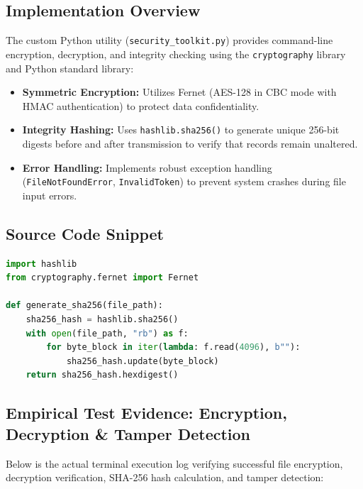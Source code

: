 \documentclass[11pt,a4paper]{article}
\begin{document}
\subsection{Implementation Overview}
The custom Python utility (\texttt{security\_toolkit.py}) provides command-line encryption, decryption, and integrity checking using the \texttt{cryptography} library and Python standard library:
\begin{itemize}
    \item \textbf{Symmetric Encryption:} Utilizes Fernet (AES-128 in CBC mode with HMAC authentication) to protect data confidentiality.
    \item \textbf{Integrity Hashing:} Uses \texttt{hashlib.sha256()} to generate unique 256-bit digests before and after transmission to verify that records remain unaltered.
    \item \textbf{Error Handling:} Implements robust exception handling (\texttt{FileNotFoundError}, \texttt{InvalidToken}) to prevent system crashes during file input errors.
\end{itemize}

\subsection{Source Code Snippet}
\begin{lstlisting}[language=Python]
import hashlib
from cryptography.fernet import Fernet

def generate_sha256(file_path):
    sha256_hash = hashlib.sha256()
    with open(file_path, "rb") as f:
        for byte_block in iter(lambda: f.read(4096), b""):
            sha256_hash.update(byte_block)
    return sha256_hash.hexdigest()
\end{lstlisting}

\subsection{Empirical Test Evidence: Encryption, Decryption \& Tamper Detection}
Below is the actual terminal execution log verifying successful file encryption, decryption verification, SHA-256 hash calculation, and tamper detection:
\end{document}
